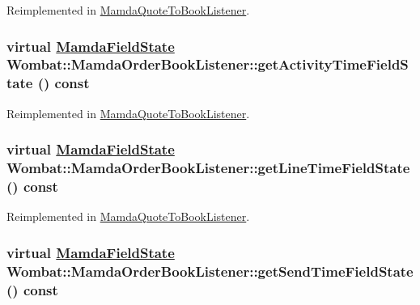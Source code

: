 Reimplemented in \hyperlink{classMamdaQuoteToBookListener_681cac13c95fbc304bc6a9432e3319fe}{Mamda\-Quote\-To\-Book\-Listener}.\hypertarget{classWombat_1_1MamdaOrderBookListener_d1aa4977550c9b83e091509faa735d76}{
\subsubsection[getActivityTimeFieldState]{\setlength{\rightskip}{0pt plus 5cm}virtual \hyperlink{namespaceWombat_93aac974f2ab713554fd12a1fa3b7d2a}{Mamda\-Field\-State} Wombat::Mamda\-Order\-Book\-Listener::get\-Activity\-Time\-Field\-State () const}}
\label{classWombat_1_1MamdaOrderBookListener_d1aa4977550c9b83e091509faa735d76}




Reimplemented in \hyperlink{classMamdaQuoteToBookListener_86342ed1f23500e6dbdbee055cb06886}{Mamda\-Quote\-To\-Book\-Listener}.\hypertarget{classWombat_1_1MamdaOrderBookListener_967aa4033993bc70c16d95d26283da54}{
\subsubsection[getLineTimeFieldState]{\setlength{\rightskip}{0pt plus 5cm}virtual \hyperlink{namespaceWombat_93aac974f2ab713554fd12a1fa3b7d2a}{Mamda\-Field\-State} Wombat::Mamda\-Order\-Book\-Listener::get\-Line\-Time\-Field\-State () const}}
\label{classWombat_1_1MamdaOrderBookListener_967aa4033993bc70c16d95d26283da54}




Reimplemented in \hyperlink{classMamdaQuoteToBookListener_72349a0b38fd3b0d53f80d29f09721c1}{Mamda\-Quote\-To\-Book\-Listener}.\hypertarget{classWombat_1_1MamdaOrderBookListener_881995554b016618dc16f9a9e15be90d}{
\subsubsection[getSendTimeFieldState]{\setlength{\rightskip}{0pt plus 5cm}virtual \hyperlink{namespaceWombat_93aac974f2ab713554fd12a1fa3b7d2a}{Mamda\-Field\-State} Wombat::Mamda\-Order\-Book\-Listener::get\-Send\-Time\-Field\-State () const}}
\label{classWombat_1_1MamdaOrderBookListener_881995554b016618dc16f9a9e15be90d}




